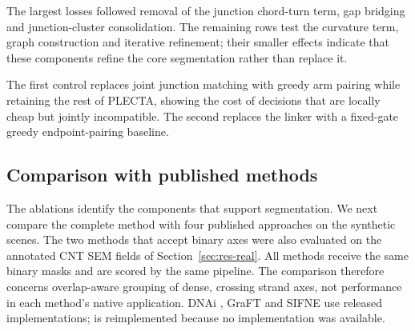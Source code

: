 The largest losses followed removal of the junction chord-turn term, gap
bridging and junction-cluster consolidation. The remaining rows test the
curvature term, graph construction and iterative refinement; their smaller
effects indicate that these components refine the core segmentation rather
than replace it.

The first control replaces joint junction matching with greedy arm pairing
while retaining the rest of PLECTA, showing the cost of decisions that are
locally cheap but jointly incompatible. The second replaces the linker with a
fixed-gate greedy endpoint-pairing baseline.

\begin{table}[tbp]
    \centering
    \caption{Component ablations and replacement controls on development
    scenes. Each $\Delta F_1$ is relative to PLECTA evaluated on the
    corresponding scene set.}
    \label{tab:plecta-ablation}
    \setlength{\tabcolsep}{3pt}
    
\end{table}


\subsection{Comparison with published methods}
\label{sec:res-comparators}

The ablations identify the components that support segmentation. We next
compare the complete method with four published approaches on the
\PlectaGreedySceneCount{} synthetic scenes. The two methods that
accept binary axes were also evaluated on the \PlectaRealFieldCountLower{}
annotated CNT SEM fields of Section~\ref{sec:res-real}. All methods receive
the same binary masks and are scored by the same pipeline. The comparison
therefore concerns overlap-aware grouping of dense, crossing strand axes, not
performance in each method's native application. DNAi \citep{playout2026dnai}, GraFT
\citep{osterlund2026graft} and SIFNE \citep{zhang2017sifne} use released
implementations; \citet{basu2015extraction} is reimplemented because no
implementation was available.


\begin{table}[!ht]
    \centering
    \caption{PLECTA and four published methods on identical masks, ordered by
    \Fone{}. The upper block uses degraded synthetic axes; the lower uses
    reference-derived axes from the CNT SEM fields of
    Section~\ref{sec:res-real}. Variation of information is in bits and lower
    is better; higher is better for the remaining metrics.\\[2pt]
    $^{*}$\,our reimplementation; no implementation of that paper was found.
    \suppcomparators{} details it.}
    \label{tab:plecta-comparators}
    \setlength{\tabcolsep}{2pt}
    
\end{table}

